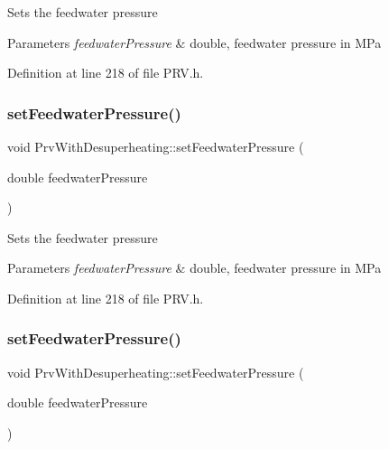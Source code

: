 Sets the feedwater pressure


\begin{DoxyParams}{Parameters}
{\em feedwater\+Pressure} & double, feedwater pressure in M\+Pa \\
\hline
\end{DoxyParams}


Definition at line 218 of file P\+R\+V.\+h.

\mbox{\label{class_prv_with_desuperheating_a8494ebf87e5bd834f621b0c7ca257fbe}} 
\subsubsection{\texorpdfstring{set\+Feedwater\+Pressure()}{setFeedwaterPressure()}\hspace{0.1cm}{\footnotesize\ttfamily [2/3]}}
{\footnotesize\ttfamily void Prv\+With\+Desuperheating\+::set\+Feedwater\+Pressure (\begin{DoxyParamCaption}\item[{double}]{feedwater\+Pressure }\end{DoxyParamCaption})\hspace{0.3cm}{\ttfamily [inline]}}

Sets the feedwater pressure


\begin{DoxyParams}{Parameters}
{\em feedwater\+Pressure} & double, feedwater pressure in M\+Pa \\
\hline
\end{DoxyParams}


Definition at line 218 of file P\+R\+V.\+h.

\mbox{\label{class_prv_with_desuperheating_a8494ebf87e5bd834f621b0c7ca257fbe}} 
\subsubsection{\texorpdfstring{set\+Feedwater\+Pressure()}{setFeedwaterPressure()}\hspace{0.1cm}{\footnotesize\ttfamily [3/3]}}
{\footnotesize\ttfamily void Prv\+With\+Desuperheating\+::set\+Feedwater\+Pressure (\begin{DoxyParamCaption}\item[{double}]{feedwater\+Pressure }\end{DoxyParamCaption})\hspace{0.3cm}{\ttfamily [inline]}}

